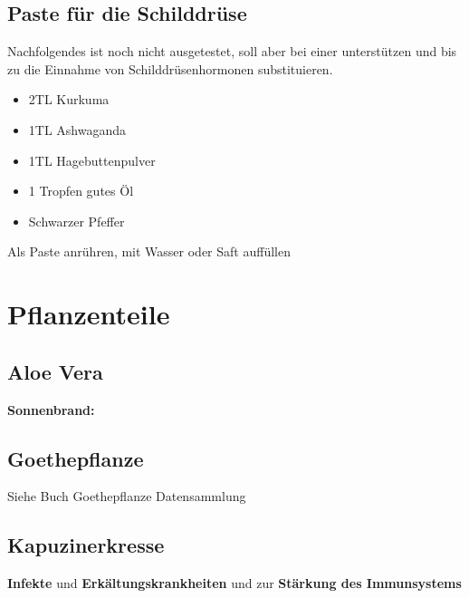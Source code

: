 \subsection{Paste für die Schilddrüse}
 
 
Nachfolgendes ist noch nicht ausgetestet, soll aber bei einer  unterstützen und bis zu die Einnahme von Schilddrüsenhormonen substituieren.

\begin{itemize}
	\item 2TL Kurkuma
	\item 1TL Ashwaganda
	\item 1TL Hagebuttenpulver
	\item 1 Tropfen gutes Öl
	\item Schwarzer Pfeffer
\end{itemize}

Als Paste anrühren, mit Wasser oder Saft auffüllen



\section{Pflanzenteile}


\subsection{Aloe Vera}


\textbf{Sonnenbrand:}


\subsection{Goethepflanze}


Siehe Buch Goethepflanze Datensammlung



\subsection{Kapuzinerkresse}


\textbf{Infekte} und \textbf{Erkältungskrankheiten} und zur \textbf{Stärkung des Immunsystems}

  






